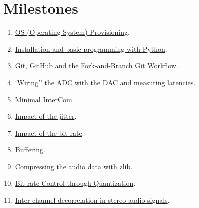 \section{Milestones}
\begin{enumerate}
\item \href{https://tecnologias-multimedia.github.io/study_guide/provisioning/}{OS (Operating System) Provisioning}.
\item \href{https://tecnologias-multimedia.github.io/study_guide/install/}{Installation and basic programming with Python}.
\item \href{https://tecnologias-multimedia.github.io/study_guide/git/}{Git, GitHub and the Fork-and-Branch Git Workflow}.
\item \href{https://tecnologias-multimedia.github.io/study_guide/wiring/}{`Wiring'' the ADC with the DAC and measuring latencies}.
\item \href{https://tecnologias-multimedia.github.io/study_guide/minimal/}{Minimal InterCom}.
\item \href{https://tecnologias-multimedia.github.io/study_guide/jitter_impact/}{Impact of the jitter}.
\item \href{https://tecnologias-multimedia.github.io/study_guide/bit-rate_impact/}{Impact of the bit-rate}.
\item \href{https://tecnologias-multimedia.github.io/study_guide/buffering/}{Buffering}.
\item \href{https://tecnologias-multimedia.github.io/study_guide/compress/}{Compressing the audio data with zlib}.
\item \href{https://tecnologias-multimedia.github.io/study_guide/quantization/}{Bit-rate Control through Quantization}.
\item \href{https://tecnologias-multimedia.github.io/study_guide/intra-channel_decorrelation/}{Inter-channel decorrelation in stereo audio signals}.
\end{enumerate}


